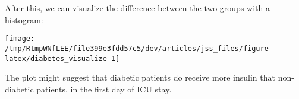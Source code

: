 \documentclass[
]{jss}
\begin{document}
After this, we can visualize the difference between the two groups with
a histogram:

\begin{CodeChunk}


\begin{center}\texttt{[image: /tmp/RtmpWNfLEE/file399e3fdd57c5/dev/articles/jss\_files/figure-latex/diabetes\_visualize-1]} \end{center}

\end{CodeChunk}

The plot might suggest that diabetic patients do receive more insulin
that non-diabetic patients, in the first day of ICU stay.


\end{document}
